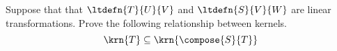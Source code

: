 Suppose that that $\ltdefn{T}{U}{V}$ and $\ltdefn{S}{V}{W}$ are linear transformations.  Prove the following relationship between kernels.
%
\begin{equation*}
\krn{T}\subseteq\krn{\compose{S}{T}}
\end{equation*}